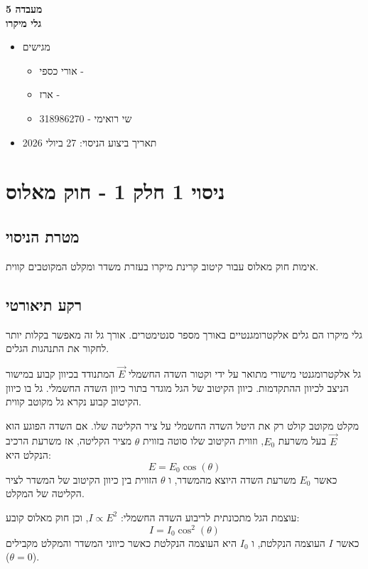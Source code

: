 \documentclass[14pt]{extarticle}
\begin{document}
\begin{center}
    {\LARGE \textbf{מעבדה 5}}\\
    {\textbf{גלי מיקרו}}
\end{center}

\begin{itemize}
    \item מגישים
    \begin{itemize}
        \item אורי כספי - 
        \item ארז - 
        \item שי רואימי - 318986270
    \end{itemize}
    \item תאריך ביצוע הניסוי: 27 ביולי 2026
\end{itemize}
\newpage
\section*{ניסוי 1 חלק 1 - חוק מאלוס}

\subsection*{מטרת הניסוי}
אימות חוק מאלוס עבור קיטוב קרינת מיקרו בעזרת משדר ומקלט המקוטבים קווית.

\subsection*{רקע תיאורטי}
גלי מיקרו הם גלים אלקטרומגנטיים באורך מספר סנטימטרים. אורך גל זה מאפשר בקלות יותר לחקור את התנהגות הגלים.

גל אלקטרומגנטי מישורי מתואר על ידי וקטור השדה החשמלי $\vec{E}$ המתנודד בכיוון קבוע במישור הניצב לכיוון ההתקדמות.  
כיוון הקיטוב של הגל מוגדר בתור כיוון השדה החשמלי.
גל בו כיוון הקיטוב קבוע נקרא גל מקוטב קווית.

מקלט מקוטב קולט רק את היטל השדה החשמלי על ציר הקליטה שלו. אם השדה הפוגע הוא $\vec{E}$ בעל משרעת $E_0$, וזווית הקיטוב שלו סוטה בזווית $\theta$ מציר הקליטה,
אז משרעת הרכיב הנקלט היא:
\begin{equation}
    E = E_0 \cos(\theta)
\end{equation}
כאשר $E_0$ משרעת השדה היוצא מהמשדר, ו $\theta$ הזווית בין כיוון הקיטוב של המשדר לציר הקליטה של המקלט.

עוצמת הגל מתכונתית לריבוע השדה החשמלי: $I \propto E^2$, וכן חוק מאלוס קובע:
\begin{equation}
    I = I_0 \cos^2(\theta)
\end{equation}
כאשר $I$ העוצמה הנקלטת, ו $I_0$ היא העוצמה הנקלטת כאשר כיווני המשדר והמקלט מקבילים ($\theta = 0$).
\end{document}

